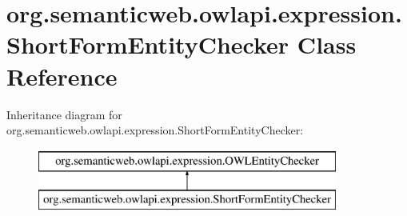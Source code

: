 \hypertarget{classorg_1_1semanticweb_1_1owlapi_1_1expression_1_1_short_form_entity_checker}{\section{org.\-semanticweb.\-owlapi.\-expression.\-Short\-Form\-Entity\-Checker Class Reference}
\label{classorg_1_1semanticweb_1_1owlapi_1_1expression_1_1_short_form_entity_checker}
}
Inheritance diagram for org.\-semanticweb.\-owlapi.\-expression.\-Short\-Form\-Entity\-Checker\-:\begin{figure}[H]
\begin{center}
\leavevmode
\includegraphics[height=2.000000cm]{classorg_1_1semanticweb_1_1owlapi_1_1expression_1_1_short_form_entity_checker}
\end{center}
\end{figure}
